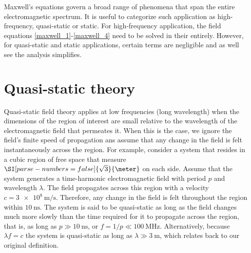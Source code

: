 \documentclass[12pt,a4paper,oneside]{book}
\begin{document}
\begin{onehalfspace}
Maxwell's equations govern a broad range of phenomena that span the entire electromagnetic spectrum. It is useful to categorize such application as high-frequency, quasi-static or static. For high-frequency application, the field equations \ref{maxwell_1}-\ref{maxwell_4} need to be solved in their entirely. However, for quasi-static and static applications, certain terms are negligible and as well see the analysis simplifies.
\section{Quasi-static theory}
Quasi-static field theory applies at low frequencies (long wavelength) when the dimensions of the region of interest are small relative to the wavelength of the electromagnetic field that permeates it. When this is the case, we ignore the field's finite speed of propagation ans assume that any change in the field is felt instantaneously across the region. For example, consider a system that resides in a cubic region of free space that measure $\SI[parse-numbers=false]{\sqrt{3}}{\meter}$ on each side. Assume that the system generates a time-harmonic electromagnetic field with period $p$ and wavelength $\lambda$. The field propagates across this region with a velocity $c=\SI{3e8}{\meter\per\second}$. Therefore, any change in the field is felt throughout the region within $\SI{10}{\nano\second}$. The system is said to be quasi-static as long as the field changes much more slowly than the time required for it to propagate across the region, that is, as long as $p\gg\SI{10}{\nano\second}$, or $f=1/p\ll\SI{100}{\mega\hertz}$. Alternatively, because $\lambda f=c$ the system is quasi-static as long as $\lambda\gg\SI{3}{\meter}$, which relates back to our original definition.


\end{onehalfspace}
\end{document}
